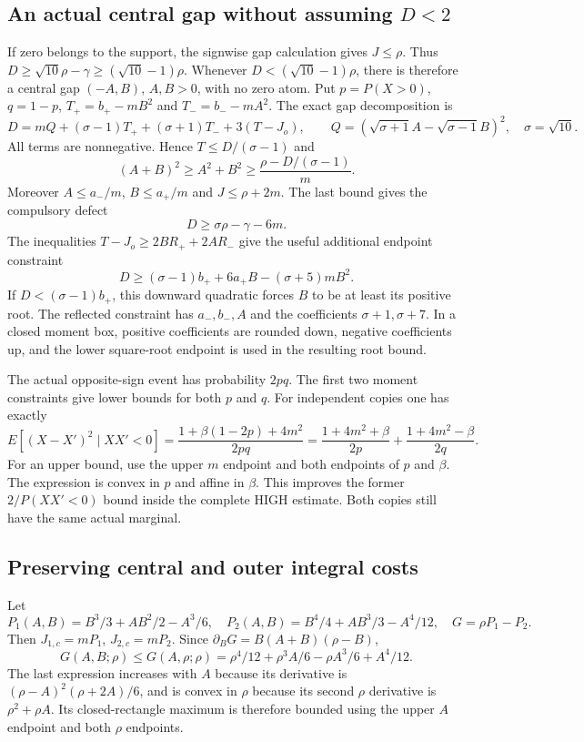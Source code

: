 \subsection{An actual central gap without assuming \texorpdfstring{$D<2$}{D below 2}}
If zero belongs to the support, the signwise gap calculation gives $J\le\rho$.
Thus $D\ge\sqrt{10}\rho-\gamma\ge(\sqrt{10}-1)\rho$.
Whenever $D<(\sqrt{10}-1)\rho$, there is therefore a central gap
$(-A,B)$, $A,B>0$, with no zero atom. Put $p=P(X>0)$, $q=1-p$,
$T_+=b_+-mB^2$ and $T_-=b_--mA^2$. The exact gap decomposition is
\[
 D=mQ+(\sigma-1)T_++(\sigma+1)T_-+3(T-J_o),\qquad
 Q=(\sqrt{\sigma+1}A-\sqrt{\sigma-1}B)^2,
 \quad\sigma=\sqrt{10}.
\]
All terms are nonnegative. Hence $T\le D/(\sigma-1)$ and
\[
 (A+B)^2\ge A^2+B^2\ge\frac{\rho-D/(\sigma-1)}m.
\]
Moreover $A\le a_-/m$, $B\le a_+/m$ and $J\le\rho+2m$.
The last bound gives the compulsory defect
\[
 D\ge \sigma\rho-\gamma-6m.
\]
The inequalities $T-J_o\ge2BR_++2AR_-$ give the useful additional
endpoint constraint
\[
 D\ge(\sigma-1)b_++6a_+B-(\sigma+5)mB^2.
\]
If $D<(\sigma-1)b_+$, this downward quadratic forces $B$ to be at
least its positive root. The reflected constraint has $a_-,b_-,A$
and the coefficients $\sigma+1,\sigma+7$. In a closed moment box,
positive coefficients are rounded down, negative coefficients up, and
the lower square-root endpoint is used in the resulting root bound.

The actual opposite-sign event has probability $2pq$.
The first two moment constraints give lower bounds for both $p$ and $q$.
For independent copies one has exactly
\[
 E[(X-X')^2\mid XX'<0]
 =\frac{1+\beta(1-2p)+4m^2}{2pq}
 =\frac{1+4m^2+\beta}{2p}
  +\frac{1+4m^2-\beta}{2q}.
\]
For an upper bound, use the upper $m$ endpoint and both endpoints of
$p$ and $\beta$. The expression is convex in $p$ and affine in $\beta$.
This improves the former $2/P(XX'<0)$ bound inside the complete HIGH
estimate. Both copies still have the same actual marginal.

\subsection{Preserving central and outer integral costs}
Let
\[
 P_1(A,B)=B^3/3+AB^2/2-A^3/6,\quad
 P_2(A,B)=B^4/4+AB^3/3-A^4/12,\quad G=\rho P_1-P_2.
\]
Then $J_{1,c}=mP_1$, $J_{2,c}=mP_2$. Since
$\partial_BG=B(A+B)(\rho-B)$,
\[
 G(A,B;\rho)\le G(A,\rho;\rho)
 =\rho^4/12+\rho^3A/6-\rho A^3/6+A^4/12.
\]
The last expression increases with $A$ because its derivative is
$(\rho-A)^2(\rho+2A)/6$, and is convex in $\rho$ because its second
$\rho$ derivative is $\rho^2+\rho A$. Its closed-rectangle maximum is
therefore bounded using the upper $A$ endpoint and both $\rho$ endpoints.

